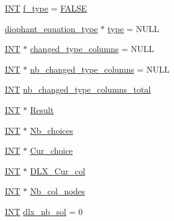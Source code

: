 \begin{DoxyCompactItemize}
\item 
\mbox{\hyperlink{galois_8h_a09fddde158a3a20bd2dcadb609de11dc}{I\+NT}} \mbox{\hyperlink{_l_i_b_2_g_a_l_o_i_s_2dlx_8_c_af79a067973c29efef17dd46c94c7164f}{f\+\_\+type}} = \mbox{\hyperlink{nauty_8h_aa93f0eb578d23995850d61f7d61c55c1}{F\+A\+L\+SE}}
\item 
\mbox{\hyperlink{galois_8h_a331aa0f3283349b42f6bab83e017cdc1}{diophant\+\_\+equation\+\_\+type}} $\ast$ \mbox{\hyperlink{_l_i_b_2_g_a_l_o_i_s_2dlx_8_c_ad241c8005abf9f323e9fffec67f55abf}{type}} = N\+U\+LL
\item 
\mbox{\hyperlink{galois_8h_a09fddde158a3a20bd2dcadb609de11dc}{I\+NT}} $\ast$ \mbox{\hyperlink{_l_i_b_2_g_a_l_o_i_s_2dlx_8_c_a376e0f759ee8183fe1c65eed134f85af}{changed\+\_\+type\+\_\+columns}} = N\+U\+LL
\item 
\mbox{\hyperlink{galois_8h_a09fddde158a3a20bd2dcadb609de11dc}{I\+NT}} $\ast$ \mbox{\hyperlink{_l_i_b_2_g_a_l_o_i_s_2dlx_8_c_af25fe05a129ceb59df0a0343e8c828e9}{nb\+\_\+changed\+\_\+type\+\_\+columns}} = N\+U\+LL
\item 
\mbox{\hyperlink{galois_8h_a09fddde158a3a20bd2dcadb609de11dc}{I\+NT}} \mbox{\hyperlink{_l_i_b_2_g_a_l_o_i_s_2dlx_8_c_ad2cf0888ae19b5b206e1a1183fbe1e85}{nb\+\_\+changed\+\_\+type\+\_\+columns\+\_\+total}}
\item 
\mbox{\hyperlink{galois_8h_a09fddde158a3a20bd2dcadb609de11dc}{I\+NT}} $\ast$ \mbox{\hyperlink{_l_i_b_2_g_a_l_o_i_s_2dlx_8_c_a621eb7b82faee8553015ab0807f92a19}{Result}}
\item 
\mbox{\hyperlink{galois_8h_a09fddde158a3a20bd2dcadb609de11dc}{I\+NT}} $\ast$ \mbox{\hyperlink{_l_i_b_2_g_a_l_o_i_s_2dlx_8_c_ab95836660d7f0c68b0e5e47b6d217eb4}{Nb\+\_\+choices}}
\item 
\mbox{\hyperlink{galois_8h_a09fddde158a3a20bd2dcadb609de11dc}{I\+NT}} $\ast$ \mbox{\hyperlink{_l_i_b_2_g_a_l_o_i_s_2dlx_8_c_aea47e949dc31b9fc5b0cd9b0c32d9e59}{Cur\+\_\+choice}}
\item 
\mbox{\hyperlink{galois_8h_a09fddde158a3a20bd2dcadb609de11dc}{I\+NT}} $\ast$ \mbox{\hyperlink{_l_i_b_2_g_a_l_o_i_s_2dlx_8_c_ac4346b332a83aed58c0b09604297e64d}{D\+L\+X\+\_\+\+Cur\+\_\+col}}
\item 
\mbox{\hyperlink{galois_8h_a09fddde158a3a20bd2dcadb609de11dc}{I\+NT}} $\ast$ \mbox{\hyperlink{_l_i_b_2_g_a_l_o_i_s_2dlx_8_c_a901598b4af338d45ca6b7d32db70ad31}{Nb\+\_\+col\+\_\+nodes}}
\item 
\mbox{\hyperlink{galois_8h_a09fddde158a3a20bd2dcadb609de11dc}{I\+NT}} \mbox{\hyperlink{_l_i_b_2_g_a_l_o_i_s_2dlx_8_c_a65af3bde03e8155923eb2fb5906f112b}{dlx\+\_\+nb\+\_\+sol}} = 0

\end{DoxyCompactItemize}
